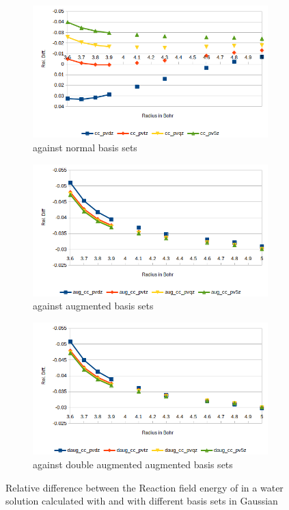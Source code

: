 \documentclass[../master_thesis.tex]{subfiles}
\begin{document}
\begin{figure}[h!]
  \centering
  \begin{subfigure}[b]{0.75\linewidth}
    \includegraphics[width=\linewidth]{img/cyanreldiff.png}
    \caption{\mrchem against normal basis sets}
  \end{subfigure}
  \begin{subfigure}[b]{0.75\linewidth}
    \includegraphics[width=\linewidth]{img/cyanaugreldiff.png}
    \caption{\mrchem against augmented basis sets}
  \end{subfigure}
  \begin{subfigure}[b]{0.75\linewidth}
    \includegraphics[width=\linewidth]{img/cyandaugreldiff.png}
    \caption{\mrchem against double augmented augmented basis sets}
  \end{subfigure}
  \caption[Relative difference between methods for ]{Relative difference between the Reaction field energy of  in a water solution calculated with \mrchem
  and with different basis sets in Gaussian}
  \label{fig:cyanreldiff}
\end{figure}



\biblio
\end{document}
